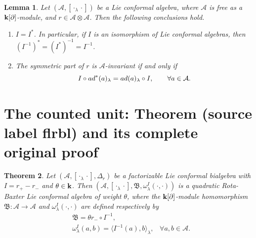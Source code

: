 \documentclass[10pt,a4paper]{amsart}
\newcommand{\A}{\mathcal{A}}
\theoremstyle{plain}
\newtheorem{theorem}{Theorem}[section]
\newtheorem{lemma}[theorem]{Lemma}
\theoremstyle{definition}
\begin{document}
\begin{lemma}\label{I}
Let $ (\A,[\cdot_\lambda\cdot])$ be a Lie conformal algebra, where
$\A$ is free as a ${\bf k}[\partial]$-module, and $r\in \A\otimes
\A$. Then the following conclusions hold.
\begin{enumerate}
    \item \label{item1}$I=I^*$. In particular, if $I$ is an isomorphism of Lie conformal algebras, then $(I^{-1})^*=(I^*)^{-1}=I^{-1}$.
    \item \label{item2}The symmetric part of $r$ is $\A$-invariant if and only if
   \begin{equation}\label{eq:rr1}
   	 I\circ {\rm ad}^*(a)_\lambda={\rm ad}(a)_\lambda\circ I,\qquad \forall a\in \A.
   	 \end{equation}
 
\end{enumerate}
\end{lemma}


\section{The counted unit: Theorem (source label flrbl) and its complete original proof}

\begin{theorem}\label{flrbl}
Let $(\A,[\cdot_\lambda \cdot],\Delta_r)$ be a factorizable Lie
conformal bialgebra with $I=r_+-r_-$ and $\theta\in {\bf k}$. Then
$(\A,[\cdot_\lambda\cdot],\mathfrak{B},\omega^I_\lambda(\cdot,\cdot))$
is a quadratic    Rota-Baxter Lie conformal
algebra of weight  $\theta$, where the ${\bf k}[\partial]$-module homomorphism
$\mathfrak{B}:\A\rightarrow \A$ and
$\omega^I_\lambda(\cdot,\cdot)$ are defined respectively by
\begin{align}
    \label{b}       &\mathfrak{B}=\theta r_-\circ I^{-1}, \\
    \label{w}       &\omega^I_\lambda(a,b)=\langle I^{-1}(a),b\rangle_\lambda,  \;\;\;\forall  a,b\in \A.
\end{align}

\end{theorem}
\end{document}
